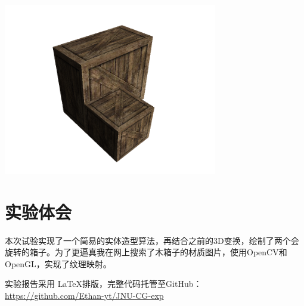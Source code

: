 \documentclass{JNUexp}
\begin{document}
\begin{image}
    \includegraphics[width=0.7\textwidth]{1}
\end{image}

\newpage
\section{实验体会}
本次试验实现了一个简易的实体造型算法，再结合之前的3D变换，绘制了两个会旋转的箱子。为了更逼真我在网上搜索了木箱子的材质图片，使用OpenCV和OpenGL，实现了纹理映射。

\vfill

实验报告采用 \LaTeX 排版，完整代码托管至GitHub：\\
\url{https://github.com/Ethan-yt/JNU-CG-exp}
\end{document}
